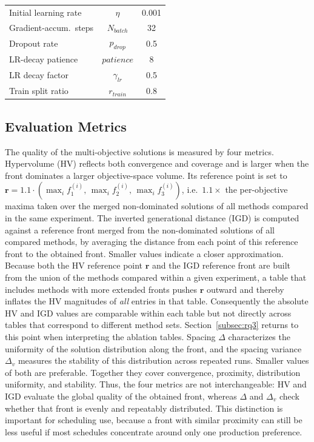 \documentclass[pdflatex,iicol,Numbered,sn-basic]{sn-jnl}
\begin{document}
\begin{table}[t]
\begin{tabular}{lcc}
    Initial learning rate        & $\eta$                                 & 0.001 \\
    Gradient-accum.\ steps       & $N_{batch}$                            & 32    \\
    Dropout rate                 & $p_{drop}$                             & 0.5   \\
    LR-decay patience            & $patience$                             & 8     \\
    LR decay factor              & $\gamma_{lr}$                          & 0.5   \\
    Train split ratio            & $r_{train}$                            & 0.8   \\
    \bottomrule
  \end{tabular}
\end{table}

\subsection{Evaluation Metrics}\label{subsec:metrics}

The quality of the multi-objective solutions is measured by four metrics.
Hypervolume (HV) reflects both convergence and coverage and is larger when the front dominates a larger objective-space volume. Its reference point is set to $\mathbf{r}=1.1\cdot(\max_i f_1^{(i)},\,\max_i f_2^{(i)},\,\max_i f_3^{(i)})$, i.e.\ $1.1\times$ the per-objective maxima taken over the merged non-dominated solutions of all methods compared in the same experiment.
The inverted generational distance (IGD) is computed against a reference front merged from the non-dominated solutions of all compared methods, by averaging the distance from each point of this reference front to the obtained front. Smaller values indicate a closer approximation.
Because both the HV reference point $\mathbf{r}$ and the IGD reference front are built from the union of the methods compared within a given experiment, a table that includes methods with more extended fronts pushes $\mathbf{r}$ outward and thereby inflates the HV magnitudes of \emph{all} entries in that table. Consequently the absolute HV and IGD values are comparable within each table but not directly across tables that correspond to different method sets. Section~\ref{subsec:rq3} returns to this point when interpreting the ablation tables.
Spacing $\Delta$ characterizes the uniformity of the solution distribution along the front, and the spacing variance $\Delta_v$ measures the stability of this distribution across repeated runs. Smaller values of both are preferable.
Together they cover convergence, proximity, distribution uniformity, and stability.
Thus, the four metrics are not interchangeable: HV and IGD evaluate the global quality of the obtained front, whereas $\Delta$ and $\Delta_v$ check whether that front is evenly and repeatably distributed.
This distinction is important for scheduling use, because a front with similar proximity can still be less useful if most schedules concentrate around only one production preference.
\end{document}

